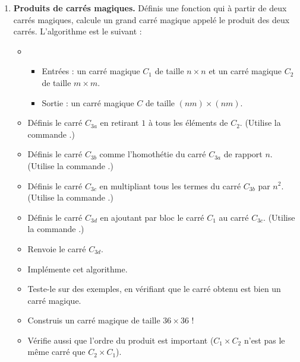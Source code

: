 \documentclass[11pt,class=report,crop=false]{standalone}
\begin{document}
\begin{activite}
\begin{enumerate}
 \item \textbf{Produits de carrés magiques.} Définis une fonction  qui à partir de deux carrés magiques, calcule un grand carré magique appelé le produit des deux carrés. L'algorithme est le suivant :

 \begin{algorithme}
  \sauteligne 
 \begin{itemize}
   \item
   \begin{itemize}
     \item Entrées : un carré magique $C_1$ de taille $n\times n$ et un carré magique $C_2$ de taille $m\times m$.
     \item Sortie : un carré magique $C$ de taille $(nm)\times(nm)$.
   \end{itemize}

  \item Définis le carré $C_{3a}$ en retirant $1$ à tous les éléments de $C_2$. (Utilise la commande .)
  
  \item Définis le carré $C_{3b}$ comme l'homothétie du carré $C_{3a}$ de rapport $n$. (Utilise la commande .)
  
  \item Définis le carré $C_{3c}$ en multipliant tous les termes du carré $C_{3b}$ par $n^2$. (Utilise la commande .)
  
  \item Définis le carré $C_{3d}$ en ajoutant par bloc le carré $C_1$ au carré $C_{3c}$. (Utilise la commande .)
  
  \item Renvoie le carré $C_{3d}$.
   
 \end{itemize}  
 \end{algorithme}
 
 \begin{itemize}
   \item Implémente cet algorithme. 
   \item Teste-le sur des exemples, en vérifiant que le carré obtenu est bien un carré magique.
   \item Construis un carré magique de taille $36 \times 36$ !
   \item Vérifie aussi que l'ordre du produit est important ($C_1 \times C_2$ n'est pas le même carré que $C_2 \times C_1$). 
  \end{itemize}  

\end{enumerate}

\end{activite}
\end{document}
